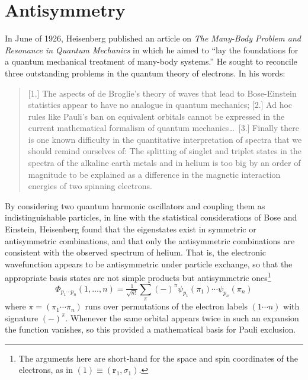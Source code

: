 \section{Antisymmetry}

In June of 1926, Heisenberg published an article on {\itshape The Many-Body
Problem and Resonance in Quantum Mechanics} in which he aimed to ``lay the
foundations for a quantum mechanical treatment of many-body
systems.''\cite{Heisenberg:1926p411}
He sought to reconcile three outstanding problems in the quantum theory of
electrons.
In his words:
\begin{quote}
    [1.] The aspects of de Broglie's theory of waves that lead to Bose-Einstein
    statistics appear to have no analogue in quantum mechanics;
    [2.] Ad hoc rules like Pauli's ban on equivalent orbitals cannot be
    expressed in the current mathematical formalism of quantum mechanics\dots\ 
    [3.] Finally there is one known difficulty in the quantitative
    interpretation of spectra that we should remind ourselves of:
    The splitting of singlet and triplet states in the spectra of the alkaline
    earth metals and in helium is too big by an order of magnitude to be
    explained as a difference in the magnetic interaction energies of two
    spinning electrons.\cite{Heisenberg:1926p411}
\end{quote}
By considering two quantum harmonic oscillators and coupling them as
indistinguishable particles, in line with the statistical considerations of Bose
and Einstein,\cite{Bose:1924p178,Einstein:1924p261,Einstein:1925p3} Heisenberg
found that the eigenstates exist in symmetric or antisymmetric combinations, and
that only the antisymmetric combinations are consistent with the observed
spectrum of helium.
That is, the electronic wavefunction appears to be antisymmetric under particle
exchange, so that the appropriate basis states are not simple products but
antisymmetric ones\footnote{%
    The arguments here are short-hand for the space and spin coordinates of the
    electrons, as in \((1) \equiv (\mathbf{r}_1, \sigma_1)\).
}
\begin{equation}
    \Phi_{p_1\cdots p_n}(1, \ldots, n)
    =
    \tfrac{1}{\sqrt{n!}}
    \sum_{\pi}
    (-)^\pi
    \psi_{p_1}(\pi_1)
    \cdots
    \psi_{p_n}(\pi_n)
\end{equation}
where \(\pi=(\pi_1\cdots \pi_n)\) runs over permutations of the electron labels
\((1\cdots n)\) with signature \((-)^\pi\).
Whenever the same orbital appears twice in such an expansion the function
vanishes, so this provided a mathematical basis for Pauli exclusion.

